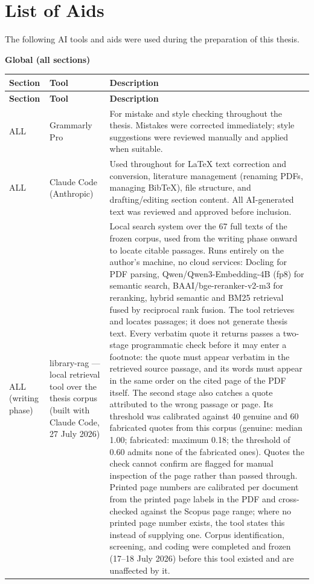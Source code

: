 \section*{List of Aids}

\noindent The following AI tools and aids were used during the preparation of this thesis.

\vspace{0.5em}
\noindent\textbf{Global (all sections)}

\begin{longtable}{@{}p{2.9cm}p{3.2cm}p{9.0cm}@{}}
\toprule
\textbf{Section} & \textbf{Tool} & \textbf{Description} \\
\midrule
\endfirsthead
\toprule
\textbf{Section} & \textbf{Tool} & \textbf{Description} \\
\midrule
\endhead
\bottomrule
\endfoot
ALL & Grammarly Pro & For mistake and style checking throughout the thesis. Mistakes were corrected immediately; style suggestions were reviewed manually and applied when suitable. \\
\addlinespace
ALL & Claude Code (Anthropic) & Used throughout for LaTeX text correction and conversion, literature management (renaming PDFs, managing BibTeX), file structure, and drafting/editing section content. All AI-generated text was reviewed and approved before inclusion. \\
\addlinespace
ALL (writing phase) & library-rag --- local retrieval tool over the thesis corpus (built with Claude Code, 27 July 2026) & Local search system over the 67 full texts of the frozen corpus, used from the writing phase onward to locate citable passages. Runs entirely on the author's machine, no cloud services: Docling for PDF parsing, Qwen/Qwen3-Embedding-4B (fp8) for semantic search, BAAI/bge-reranker-v2-m3 for reranking, hybrid semantic and BM25 retrieval fused by reciprocal rank fusion. The tool retrieves and locates passages; it does not generate thesis text. Every verbatim quote it returns passes a two-stage programmatic check before it may enter a footnote: the quote must appear verbatim in the retrieved source passage, and its words must appear in the same order on the cited page of the PDF itself. The second stage also catches a quote attributed to the wrong passage or page. Its threshold was calibrated against 40 genuine and 60 fabricated quotes from this corpus (genuine: median 1.00; fabricated: maximum 0.18; the threshold of 0.60 admits none of the fabricated ones). Quotes the check cannot confirm are flagged for manual inspection of the page rather than passed through. Printed page numbers are calibrated per document from the printed page labels in the PDF and cross-checked against the Scopus page range; where no printed page number exists, the tool states this instead of supplying one. Corpus identification, screening, and coding were completed and frozen (17--18 July 2026) before this tool existed and are unaffected by it. \\

\end{longtable}
